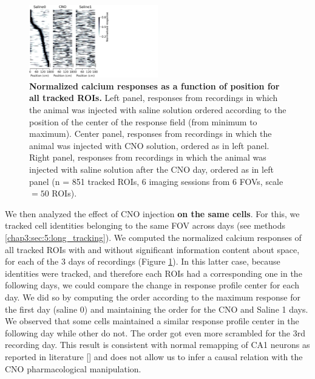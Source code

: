 \begin{figure}
    \centering
    \includegraphics[trim={0 0 450 0},clip,width=0.5\textwidth]{Figures/Chapter4/snake_plots_long_same_order.pdf}
    \caption[Normalized calcium responses as a function of position for all tracked ROIs]{\textbf{Normalized calcium responses as a function of position for all tracked ROIs.} 
    Left panel, responses from recordings in which the animal was injected with saline solution ordered according to the position of the center of the response field (from minimum to maximum). 
    Center panel, responses from recordings in which the animal was injected with CNO solution, ordered as in left panel. 
    Right panel, responses from recordings in which the animal was injected with saline solution after the CNO day, ordered as in left panel (n = 851 tracked ROIs, 6 imaging sessions from 6 FOVs, scale $= 50$ ROIs).}
    \label{fig:chap4:snake_plots_long_same_order}
\end{figure}
We then analyzed the effect of CNO injection \textbf{on the same cells}. 
For this, we tracked cell identities belonging to the same FOV across days (see methods \ref{chap3:sec:5:long_tracking}).
We computed the normalized calcium responses of all tracked ROIs with and without significant information content about space, for each of the 3 days of recordings (Figure \ref{fig:chap4:snake_plots_long_same_order}).
In this latter case, because identities were tracked, and therefore each ROIs had a corresponding one in the following days, we could compare the change in response profile center for each day.
We did so by computing the order according to the maximum response for the first day (saline 0) and maintaining the order for the CNO and Saline 1 days. 
We observed that some cells maintained a similar response profile center in the following day while other do not. 
The order got even more scrambled for the 3rd recording day. 
This result is consistent with normal remapping of CA1 neurons as reported in literature [\cite{ziv2013}] and does not allow us to infer a causal relation with the CNO pharmacological manipulation.

